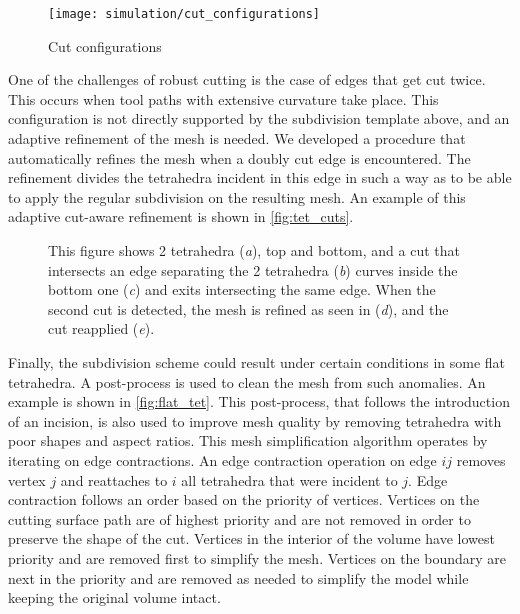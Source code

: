 \begin{figure}
  \centering%
  \texttt{[image: simulation/cut\_configurations]}
  \caption{Cut configurations}\label{fig:discontinuous_tetrahedra_fem}
\end{figure}


One of the challenges of robust cutting is the case of edges that get cut twice. This occurs when tool paths with extensive curvature take place. This configuration is not directly supported by the subdivision template above, and an adaptive refinement of the mesh is needed. We developed a procedure that automatically refines the mesh when a doubly cut edge is encountered. The refinement divides the tetrahedra incident in this edge in such a way as to be able to apply the regular subdivision on the resulting mesh.  An example of this adaptive cut-aware refinement is shown in \autoref{fig:tet_cuts}.

\begin{figure}
  \centering%
  \hfill%
  \hfill%
  \hfill%
  \hfill%
  \caption{This figure shows 2 tetrahedra (\emph{a}), top and bottom, and a cut that intersects an edge separating the 2 tetrahedra (\emph{b}) curves inside the bottom one (\emph{c}) and exits intersecting the same edge. When the second cut is detected, the mesh is refined as seen in (\emph{d}), and the cut reapplied (\emph{e}).}\label{fig:tet_cuts}
\end{figure}


Finally, the subdivision scheme could result under certain conditions in some flat tetrahedra. A post-process is used to clean the mesh from such anomalies. An example is shown in \autoref{fig:flat_tet}. This post-process, that follows the introduction of an incision, is also used to improve mesh quality by removing tetrahedra with poor shapes and aspect ratios. This mesh simplification algorithm operates by iterating on edge contractions. An edge contraction operation on edge $ij$ removes vertex $j$ and reattaches to $i$ all tetrahedra that were incident to $j$. Edge contraction follows an order based on the priority of vertices. Vertices on the cutting surface path are of highest priority and are not removed in order to preserve the shape of the cut. Vertices in the interior of the volume have lowest priority and are removed first to simplify the mesh. Vertices on the boundary are next in the priority and are removed as needed to simplify the model while keeping the original volume intact.


